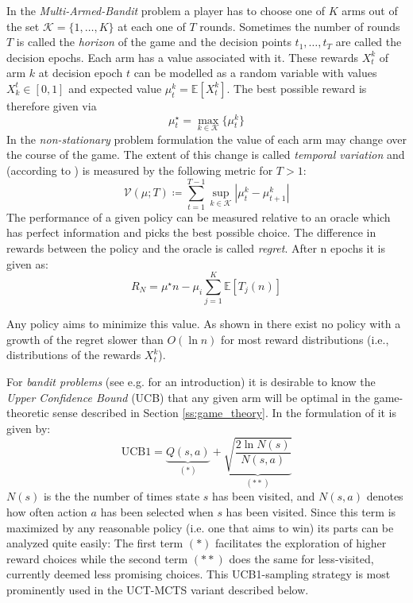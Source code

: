 In the \textit{Multi-Armed-Bandit} problem a player has to choose one of $K$ arms out of the set $\mathcal{K} = \{1,\ldots,K \}$ at each one of $T$ rounds. Sometimes the number of rounds $T$ is called the \textit{horizon} of the game and the decision points $t_1,\ldots,t_T$ are called the decision epochs. Each arm has a value associated with it. These rewards $X^k_t$ of arm $k$ at decision epoch $t$ can be modelled as a random variable with values $X_k^t \in [0,1]$ and expected value $\mu_t^k = \mathbb{E}[X^k_t]$. The best possible reward is therefore given via 
\begin{equation*}
\mu^\star_t = \max_{k \in \mathcal{K}} \{ \mu^k_t\}    
\end{equation*}
In the \textit{non-stationary} problem formulation the value of each arm may change over the course of the game. The extent of this change is called \textit{temporal variation} and (according to \cite{besbes2019optimal}) is measured by the following metric for $T > 1$:
\begin{equation}
    \mathcal{V}(\mu;T) \coloneqq \sum_{t=1}^{T-1} \sup_{k \in \mathcal{K}} \left| \mu_t^k - \mu_{t+1}^k \right|
\end{equation}
The performance of a given policy can be measured relative to an oracle which has perfect information and picks the best possible choice. The difference in rewards between the policy and the oracle is called \textit{regret}. After n epochs it is given as:
\begin{equation}
    R_N = \mu^\star n - \mu_i \sum_{j=1}^K \mathbb{E}[T_j(n)]
\end{equation}

Any policy aims to minimize this value. As shown in \cite{lai1985asymptotically} there exist no policy with a growth of the regret slower than $O(\ln n)$ for most reward distributions (i.e., distributions of the rewards $X^k_t$).


For \textit{bandit problems} (see e.g. \cite{lattimore2018bandit} for an introduction) it is desirable to know the \textit{Upper Confidence Bound} (UCB) that any given arm will be optimal in the game-theoretic sense described in Section \ref{ss:game_theory}. In the formulation of \cite{sironi2019comparing} it is given by:
\begin{equation}
    \text{UCB1} = \underbrace{Q(s,a)}_{(\ast)} +  \underbrace{\sqrt{\frac{2 \ln N(s)}{N(s,a)}}}_{(\ast \ast)}
\end{equation}
$N(s)$ is the the number of times state $s$ has been visited, and $N(s,a)$ denotes how often action $a$ has been selected when $s$ has been visited.
Since this term is maximized by any reasonable policy (i.e. one that aims to win) its parts can be analyzed quite easily: The first term $(\ast)$ facilitates the exploration of higher reward choices while the second term $(\ast \ast)$ does the same for less-visited, currently deemed less promising choices. This UCB1-sampling strategy is most prominently used in the UCT-MCTS variant described below. 
